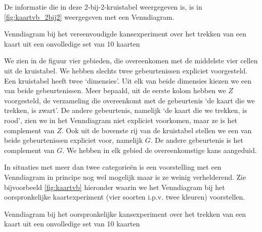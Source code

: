 \begin{multicols}{2}
De informatie die in deze 2-bij-2-kruistabel weergegeven is, is in \autoref{fig:kaartvb_2bij2}
weergegeven met een Venndiagram. 

\begin{afbeeldingenv}
\caption{Venndiagram bij het vereenvoudigde kansexperiment over het trekken van een kaart uit een onvolledige set van 10 kaarten}
\label{fig:kaartvb_2bij2}
\end{afbeeldingenv}

We zien in de figuur vier gebieden, die overeenkomen met de middelste vier cellen uit de kruistabel. We hebben slechts twee gebeurtenissen expliciet voorgesteld. Een kruistabel heeft twee ‘dimensies’. Uit elk van beide dimensies kiezen we een van beide gebeurtenissen. Meer bepaald, uit de eerste kolom hebben we $Z$ voorgesteld, de verzameling die overeenkomt met de gebeurtenis ‘de kaart die we trekken, is zwart’. De andere gebeurtenis, namelijk ‘de kaart die we trekken, is rood’, zien we in het Venndiagram niet expliciet voorkomen, maar ze is het complement van $Z$. Ook uit de bovenste rij van de kruistabel stellen we een van beide gebeurtenissen expliciet voor, namelijk $G$. De andere gebeurtenis is het complement van $G$. We hebben in elk gebied de overeenkomstige kans aangeduid.

In situaties met meer dan twee categorieën is een voorstelling met een Venndiagram in principe nog wel mogelijk maar is ze weinig verhelderend. Zie bijvoorbeeld \autoref{fig:kaartvb} hieronder waarin we het Venndiagram bij het oorspronkelijke kaartexperiment (vier soorten i.p.v. twee kleuren) voorstellen.

\begin{afbeeldingenv}
\caption{Venndiagram bij het oorspronkelijke kansexperiment over het trekken van een kaart uit een onvolledige set van 10 kaarten}
\label{fig:kaartvb}
\end{afbeeldingenv}


\end{multicols}
